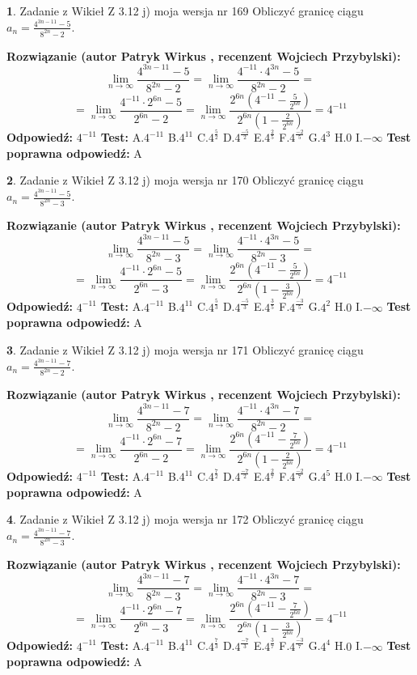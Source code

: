 \documentclass[12pt, a4paper]{article}
\theoremstyle{definition} %
\newtheorem{zad}{}
\newcommand{\zadStart}[1]{\begin{zad}#1\newline}
\newcommand{\zadStop}{\end{zad}}
\newcommand{\rozwStart}[2]{\noindent \textbf{Rozwiązanie (autor #1 , recenzent #2): }\newline}
\newcommand{\rozwStop}{\newline}
\newcommand{\odpStart}{\noindent \textbf{Odpowiedź:}\newline}
\newcommand{\odpStop}{\newline}
\newcommand{\testStart}{\noindent \textbf{Test:}\newline}
\newcommand{\testStop}{\newline}
\newcommand{\kluczStart}{\noindent \textbf{Test poprawna odpowiedź:}\newline}
\newcommand{\kluczStop}{\newline}
\begin{document}
\zadStart{Zadanie z Wikieł Z 3.12 j) moja wersja nr 169}
Obliczyć granicę ciągu $a_{n}=\frac{4^{3n-11}-5}{8^{2n}-2}$.
\zadStop
\rozwStart{Patryk Wirkus}{Wojciech Przybylski}
$$\lim\limits_{n\to\infty}\frac{4^{3n-11}-5}{8^{2n}-2}= \lim\limits_{n\to\infty}\frac{4^{-11} \cdot 4^{3n}-5}{8^{2n}-2}=$$
$$= \lim\limits_{n\to\infty}\frac{4^{-11} \cdot 2^{6n}-5}{2^{6n}-2}= \lim\limits_{n\to\infty}\frac{2^{6n}(4^{-11} - \frac{5}{2^{6n}})}{2^{6n}(1-\frac{2}{2^{6n}})}= 4^{-11}$$
\rozwStop
\odpStart
$4^{-11}$
\odpStop
\testStart
A.$4^{-11}$
B.$4^{11}$
C.$4^{\frac{5}{2}}$
D.$4^{\frac{-5}{2}}$
E.$4^{\frac{2}{5}}$
F.$4^{\frac{-2}{5}}$
G.$4^{3}$
H.$0$
I.$-\infty$
\testStop
\kluczStart
A
\kluczStop



\zadStart{Zadanie z Wikieł Z 3.12 j) moja wersja nr 170}
Obliczyć granicę ciągu $a_{n}=\frac{4^{3n-11}-5}{8^{2n}-3}$.
\zadStop
\rozwStart{Patryk Wirkus}{Wojciech Przybylski}
$$\lim\limits_{n\to\infty}\frac{4^{3n-11}-5}{8^{2n}-3}= \lim\limits_{n\to\infty}\frac{4^{-11} \cdot 4^{3n}-5}{8^{2n}-3}=$$
$$= \lim\limits_{n\to\infty}\frac{4^{-11} \cdot 2^{6n}-5}{2^{6n}-3}= \lim\limits_{n\to\infty}\frac{2^{6n}(4^{-11} - \frac{5}{2^{6n}})}{2^{6n}(1-\frac{3}{2^{6n}})}= 4^{-11}$$
\rozwStop
\odpStart
$4^{-11}$
\odpStop
\testStart
A.$4^{-11}$
B.$4^{11}$
C.$4^{\frac{5}{3}}$
D.$4^{\frac{-5}{3}}$
E.$4^{\frac{3}{5}}$
F.$4^{\frac{-3}{5}}$
G.$4^{2}$
H.$0$
I.$-\infty$
\testStop
\kluczStart
A
\kluczStop



\zadStart{Zadanie z Wikieł Z 3.12 j) moja wersja nr 171}
Obliczyć granicę ciągu $a_{n}=\frac{4^{3n-11}-7}{8^{2n}-2}$.
\zadStop
\rozwStart{Patryk Wirkus}{Wojciech Przybylski}
$$\lim\limits_{n\to\infty}\frac{4^{3n-11}-7}{8^{2n}-2}= \lim\limits_{n\to\infty}\frac{4^{-11} \cdot 4^{3n}-7}{8^{2n}-2}=$$
$$= \lim\limits_{n\to\infty}\frac{4^{-11} \cdot 2^{6n}-7}{2^{6n}-2}= \lim\limits_{n\to\infty}\frac{2^{6n}(4^{-11} - \frac{7}{2^{6n}})}{2^{6n}(1-\frac{2}{2^{6n}})}= 4^{-11}$$
\rozwStop
\odpStart
$4^{-11}$
\odpStop
\testStart
A.$4^{-11}$
B.$4^{11}$
C.$4^{\frac{7}{2}}$
D.$4^{\frac{-7}{2}}$
E.$4^{\frac{2}{7}}$
F.$4^{\frac{-2}{7}}$
G.$4^{5}$
H.$0$
I.$-\infty$
\testStop
\kluczStart
A
\kluczStop



\zadStart{Zadanie z Wikieł Z 3.12 j) moja wersja nr 172}
Obliczyć granicę ciągu $a_{n}=\frac{4^{3n-11}-7}{8^{2n}-3}$.
\zadStop
\rozwStart{Patryk Wirkus}{Wojciech Przybylski}
$$\lim\limits_{n\to\infty}\frac{4^{3n-11}-7}{8^{2n}-3}= \lim\limits_{n\to\infty}\frac{4^{-11} \cdot 4^{3n}-7}{8^{2n}-3}=$$
$$= \lim\limits_{n\to\infty}\frac{4^{-11} \cdot 2^{6n}-7}{2^{6n}-3}= \lim\limits_{n\to\infty}\frac{2^{6n}(4^{-11} - \frac{7}{2^{6n}})}{2^{6n}(1-\frac{3}{2^{6n}})}= 4^{-11}$$
\rozwStop
\odpStart
$4^{-11}$
\odpStop
\testStart
A.$4^{-11}$
B.$4^{11}$
C.$4^{\frac{7}{3}}$
D.$4^{\frac{-7}{3}}$
E.$4^{\frac{3}{7}}$
F.$4^{\frac{-3}{7}}$
G.$4^{4}$
H.$0$
I.$-\infty$
\testStop
\kluczStart
A
\kluczStop
\end{document}
